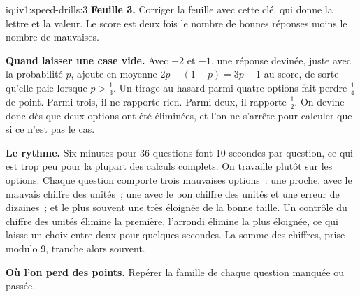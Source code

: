\begin{solution}{iq:iv1:speed-drills:3}
\textbf{Feuille 3.} Corriger la feuille avec cette clé, qui donne la lettre et la valeur. Le score est deux fois le nombre de bonnes réponses moins le nombre de mauvaises.
\par\nopagebreak


\textbf{Quand laisser une case vide.} Avec $+2$ et $-1$, une réponse devinée, juste avec la probabilité $p$, ajoute en moyenne $2p - (1 - p) = 3p - 1$ au score, de sorte qu'elle paie lorsque $p > \tfrac13$. Un tirage au hasard parmi quatre options fait perdre $\tfrac14$ de point. Parmi trois, il ne rapporte rien. Parmi deux, il rapporte $\tfrac12$. On devine donc dès que deux options ont été éliminées, et l'on ne s'arrête pour calculer que si ce n'est pas le cas.

\textbf{Le rythme.} Six minutes pour 36 questions font 10 secondes par question, ce qui est trop peu pour la plupart des calculs complets. On travaille plutôt sur les options. Chaque question comporte trois mauvaises options~: une proche, avec le mauvais chiffre des unités~; une avec le bon chiffre des unités et une erreur de dizaines~; et le plus souvent une très éloignée de la bonne taille. Un contrôle du chiffre des unités élimine la première, l'arrondi élimine la plus éloignée, ce qui laisse un choix entre deux pour quelques secondes. La somme des chiffres, prise modulo 9, tranche alors souvent.

\textbf{Où l'on perd des points.} Repérer la famille de chaque question manquée ou passée.


\end{solution}

